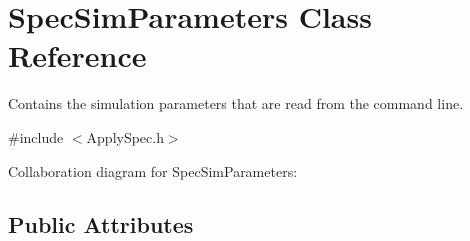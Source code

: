 \hypertarget{struct_spec_sim_parameters}{}\section{Spec\+Sim\+Parameters Class Reference}
\label{struct_spec_sim_parameters}


Contains the simulation parameters that are read from the command line.  




{\ttfamily \#include $<$Apply\+Spec.\+h$>$}



Collaboration diagram for Spec\+Sim\+Parameters\+:
\subsection*{Public Attributes}
